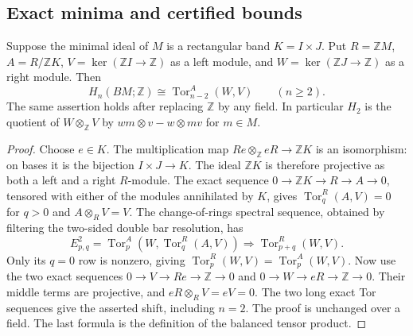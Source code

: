 \subsection{Exact minima and certified bounds}
\begin{lemma}\label{lem:B-band-Tor}
Suppose the minimal ideal of $M$ is a rectangular band $K=I\times J$.
Put $R=\mathbb ZM$, $A=R/\mathbb ZK$,
$V=\ker(\mathbb ZI\to\mathbb Z)$ as a left module, and
$W=\ker(\mathbb ZJ\to\mathbb Z)$ as a right module.  Then
\[
 H_n(BM;\mathbb Z)\cong\operatorname{Tor}^{A}_{n-2}(W,V)
 \qquad(n\ge2).
\]
The same assertion holds after replacing $\mathbb Z$ by any field.
In particular $H_2$ is the quotient of $W\otimes_{\mathbb Z}V$
by $wm\otimes v-w\otimes mv$ for $m\in M$.
\end{lemma}
\begin{proof}
Choose $e\in K$.  The multiplication map
$Re\otimes_{\mathbb Z}eR\to\mathbb ZK$ is an isomorphism:
on bases it is the bijection $I\times J\to K$.
The ideal $\mathbb ZK$ is therefore projective as both a left and
a right $R$-module.  The exact sequence
$0\to\mathbb ZK\to R\to A\to0$, tensored with either of
the modules annihilated by $K$, gives
$\operatorname{Tor}^{R}_q(A,V)=0$ for $q>0$ and
$A\otimes_R V=V$.  The change-of-rings spectral sequence, obtained
by filtering the two-sided double bar resolution, has
\[
 E^2_{p,q}=\operatorname{Tor}^{A}_p
       (W,\operatorname{Tor}^{R}_q(A,V))
 \Longrightarrow\operatorname{Tor}^{R}_{p+q}(W,V).
\]
Only its $q=0$ row is nonzero, giving
$\operatorname{Tor}^{R}_p(W,V)=\operatorname{Tor}^{A}_p(W,V)$.
Now use the two exact sequences
$0\to V\to Re\to\mathbb Z\to0$ and
$0\to W\to eR\to\mathbb Z\to0$.
Their middle terms are projective, and $eR\otimes_R V=eV=0$.
The two long exact Tor sequences give the asserted shift, including
$n=2$.  The proof is unchanged over a field.  The last formula is
the definition of the balanced tensor product.
\end{proof}



